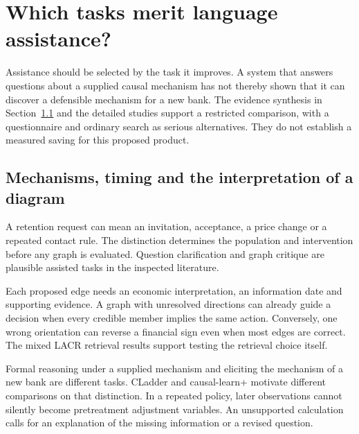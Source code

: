 \chapter{Which tasks merit language assistance?}
\label{rewrite:assistance-tasks}

Assistance should be selected by the task it improves. A system that answers
questions about a supplied causal mechanism has not thereby shown that
it can discover a defensible mechanism for a new bank. The evidence
synthesis in Section~\ref{scisyn:assistance} and the detailed studies
support a restricted comparison, with a questionnaire and ordinary search
as serious alternatives. They do not establish a measured saving for this
proposed product.



\section{Mechanisms, timing and the interpretation of a diagram}
\label{scisyn:assistance}
A retention request can mean an invitation, acceptance, a price change or a
repeated contact rule. The distinction determines the population and
intervention before any graph is evaluated. Question clarification and graph
critique are plausible assisted tasks in the inspected literature.
\citep{v12_la_2305_00050,v12_la_2606_23608}

Each proposed edge needs an economic interpretation, an information date and
supporting evidence. A graph with unresolved directions can already guide a
decision when every credible member implies the same action. Conversely, one
wrong orientation can reverse a financial sign even when most edges are
correct. The mixed LACR retrieval results support testing the retrieval choice
itself. \citep{v12_la_2402_15301}

Formal reasoning under a supplied mechanism and eliciting the mechanism of a
new bank are different tasks. CLadder and causal-learn+ motivate different
comparisons on that distinction. In a repeated policy, later observations
cannot silently become pretreatment adjustment variables. An unsupported
calculation calls for an explanation of the missing information or a revised
question. \citep{v12_la_2312_04350,v12_la_2606_23608}




